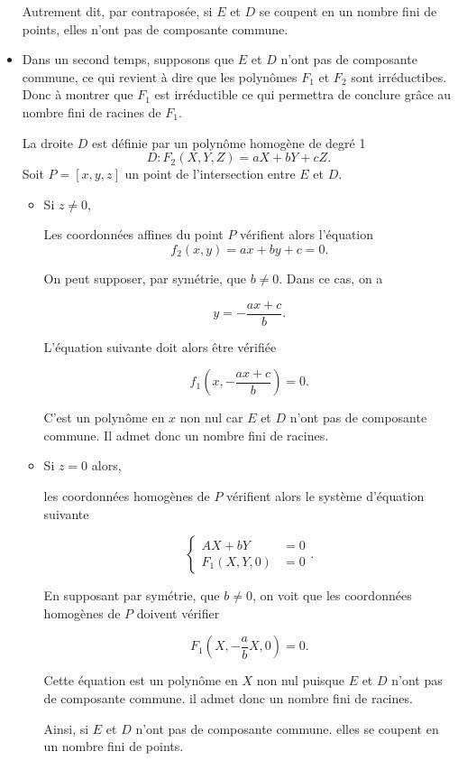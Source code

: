 \begin{demonstration}
\begin{itemize}
    Autrement dit, par contraposée, si $E$ et $D$ se coupent en un nombre fini de points, elles n'ont pas
    de composante commune.

    \item Dans un second temps, supposons que $E$ et $D$ n'ont pas de composante commune, ce
        qui revient à dire que les polynômes $F_1$ et $F_2$ sont irréductibes. Donc à montrer
        que $F_1$ est irréductible ce qui permettra de conclure grâce au nombre fini de
        racines
        de $F_1$.

    La droite $D$ est définie par un polynôme homogène de degré 1
    \[
    D : F_2(X,Y,Z) = aX + bY + cZ
    .\] 
    Soit $P=[x,y,z]$ un point de l'intersection entre $E$ et $D$.

    \begin{itemize}
        \item Si $z \neq 0$,

            Les coordonnées affines du point $P$ vérifient alors l'équation 
            \[
            f_2(x,y) = ax+by+c = 0
            .\] 

            On peut supposer, par symétrie, que $b \neq 0$. Dans ce cas, on a

            \[
            y = - \frac{ax + c}{b}
            .\] 

            L'équation suivante doit alors être vérifiée

            \[
            f_1(x, - \frac{ax+c}{b}) = 0
            .\] 

            C'est un polynôme en $x$ non nul car $E$ et $D$ n'ont pas de composante commune.
            Il admet donc un nombre fini de racines.

        \item Si $z = 0$ alors,

            les coordonnées homogènes de $P$ vérifient alors le système d'équation suivante

            \[
                \begin{cases}
                    AX + bY &= 0 \\
                    F_1(X,Y,0) &= 0
                \end{cases}
            .\] 

            En supposant par symétrie, que $b \neq 0$, on voit que les coordonnées
            homogènes de $P$ doivent vérifier

            \[
            F_1(X,- \frac{a}{b}X,0)=0
            .\] 

            Cette équation est un polynôme en $X$ non nul puisque $E$ et $D$ n'ont pas de
            composante commune. il admet donc un nombre fini de racines.

            Ainsi, si $E$ et $D$ n'ont pas de composante commune. elles se coupent en un
            nombre fini de points.
    \end{itemize}
    \end{itemize}
\end{demonstration}

